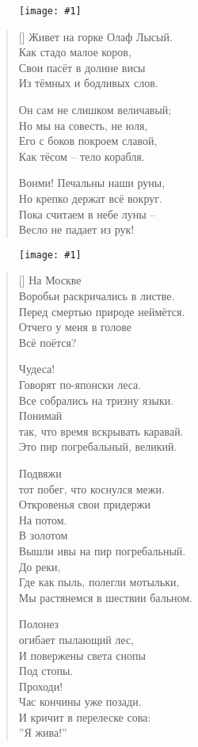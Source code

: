 \documentclass[12pt,a5paper,twoside]{article}
\newcommand{\pict}[1]{\thispagestyle{empty}\begin{figure}[H]\begin{center}\texttt{[image: \#1]}\end{center}\end{figure}\newpage}
\begin{document}
\pict{picts/Givet_na_gorke_Olaf_Lusiy} 
%



\settowidth{\versewidth}{Живет на горке Олаф Лысый.}
\begin{verse}[\versewidth]
Живет на горке Олаф Лысый.\\
Как стадо малое коров,\\
Свои пасёт в долине висы\\
Из тёмных и бодливых слов.

Он сам не слишком величавый;\\
Но мы на совесть, не юля,\\
Его с боков покроем славой,\\
Как тёсом – тело корабля.

Вонми! Печальны наши руны,\\
Но крепко держат всё вокруг.\\
Пока считаем в небе луны –\\
Весло не падает из рук!
\end{verse}
\newpage



\pict{picts/Na_Moskve} 
%



\poemtitle[На Москве]{* * *}
\settowidth{\versewidth}{Воробьи раскричались в листве.}
\begin{verse}[\versewidth]
На Москве\\
Воробьи раскричались в листве.\\
Перед смертью природе неймётся.\\
Отчего у меня в голове\\
Всё поётся?

Чудеса!\\
Говорят по-японски леса.\\
Все собрались на тризну языки.\\
Понимай\\
так, что время вскрывать каравай.\\
Это пир погребальный, великий.

Подвяжи\\
тот побег, что коснулся межи.\\
Откровенья свои придержи\\
На потом.\\
В золотом\\
Вышли ивы на пир погребальный.\\
До реки,\\
Где как пыль, полегли мотыльки,\\
Мы растянемся в шествии бальном.

Полонез\\
огибает пылающий лес,\\
И повержены света снопы\\
Под стопы.\\
Проходи!\\
Час кончины уже позади.\\
И кричит в перелеске сова:\\
”Я жива!”
\end{verse}
\newpage
\end{document}
